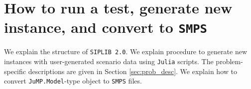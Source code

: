 \begin{table}[H]
	\centering
	\caption{Problem-specific instance naming rules}
	\label{my-label}
\end{table}
\section{How to run a test, generate new instance, and convert to \texttt{SMPS}}

We explain the structure of \texttt{SIPLIB 2.0}. We explain procedure to generate new instances with user-generated scenario data using \texttt{Julia} scripts. The problem-specific descriptions are given in Section \ref{sec:prob_desc}. We explain how to convert \texttt{JuMP.Model}-type object to \texttt{SMPS} files.

